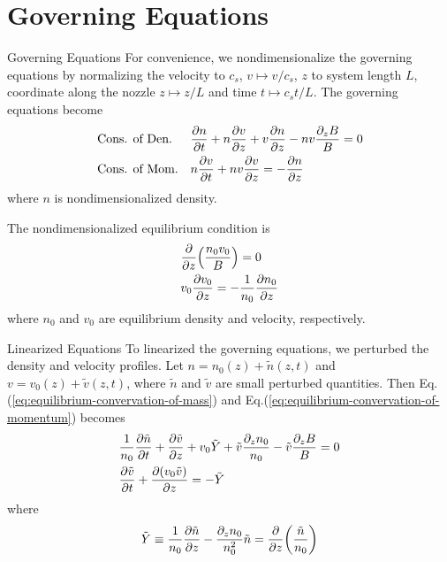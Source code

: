 \section{Governing Equations}
\begin{frame}{Governing Equations}
  For convenience, we nondimensionalize the governing equations by normalizing the velocity to $c_s$, $v\mapsto v/c_s$, $z$ to system length $L$, coordinate along the nozzle $z \mapsto z/L$ and time $t\mapsto c_s t/L$. The governing equations become
  \begin{align}
    & \text{Cons. of Den.}  &&\pdv{n}{t} + n\pdv{v}{z} + v\pdv{n}{z} - nv\frac{\partial_z B}{B} = 0 \\
    & \text{Cons. of Mom.}  &&n\pdv{v}{t} + nv\pdv{v}{z} = -\pdv{n}{z}
  \end{align}
  where $n$ is nondimensionalized density. 

  The nondimensionalized equilibrium condition is
  \begin{align}
      &\pdv{z}(\frac{n_0v_0}{B}) = 0 \label{eq:equilibrium-convervation-of-mass}\\
      &v_0\pdv{v_0}{z} = -\frac{1}{n_0}\pdv{n_0}{z} \label{eq:equilibrium-convervation-of-momentum}
  \end{align}
  where $n_0$ and $v_0$ are equilibrium density and velocity, respectively.
\end{frame}

\begin{frame}{Linearized Equations}
  To linearized the governing equations, we perturbed the density and velocity profiles. Let $n = n_0(z) + \tilde{n}(z,t)$ and $v = v_0(z) + \tilde{v}(z,t)$, where $\tilde{n}$ and $\tilde{v}$ are small perturbed quantities. Then Eq.(\ref{eq:equilibrium-convervation-of-mass}) and Eq.(\ref{eq:equilibrium-convervation-of-momentum}) becomes 
  \begin{align}
    &\frac{1}{n_0}\pdv{\tilde{n}}{t} 
    + \pdv{\tilde{v}}{z} + v_0\tilde{Y} + \tilde{v}\frac{\partial_z n_0}{n_0} - \tilde{v}\frac{\partial_z B}{B} = 0 
    \label{eq:linearized-conservation-of-mass}
    \\
    &\pdv{\tilde{v}}{t} + \pdv{(v_0\tilde{v})}{z} = -\tilde{Y}
    \label{eq:linearized-conservation-of-momentum}
  \end{align}
  where 
  \[ \tilde{Y} \equiv \frac{1}{n_0}\pdv{\tilde{n}}{z} - \frac{\partial_z n_0}{n_0^2}\tilde{n} = \pdv{z}(\frac{\tilde{n}}{n_0}) \]
\end{frame}
 
